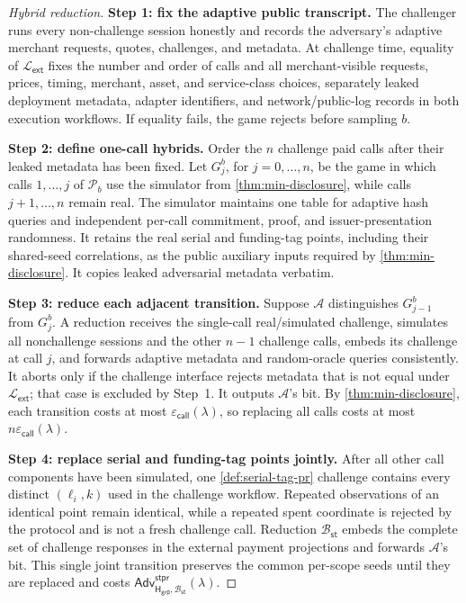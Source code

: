 \documentclass[letterpaper]{article}
\newcommand{\trace}{\mathcal{P}}
\newcommand{\adv}{\mathcal{A}}
\newcommand{\hashG}{\mathsf{H}_{\mathsf{grp}}}
\newcommand{\Adv}{\mathsf{Adv}}
\begin{document}
\begin{proof}[Hybrid reduction]
\textbf{Step 1: fix the adaptive public transcript.}
The challenger runs every non-challenge session honestly and records the
adversary's adaptive merchant requests, quotes, challenges, and metadata. At
challenge time, equality of \(\mathcal L_{\mathsf{ext}}\) fixes the number and
order of calls and all merchant-visible requests, prices, timing, merchant,
asset, and service-class choices, separately leaked deployment metadata,
adapter identifiers, and network/public-log records in both
execution workflows. If equality fails, the game rejects before sampling \(b\).

\textbf{Step 2: define one-call hybrids.}
Order the \(n\) challenge paid calls after their leaked metadata has been
fixed. Let \(G_j^b\), for \(j=0,\ldots,n\), be the game in which calls
\(1,\ldots,j\) of \(\trace_b\) use the simulator from
\cref{thm:min-disclosure}, while calls \(j+1,\ldots,n\) remain real. The
simulator maintains one table for adaptive hash queries and independent
per-call commitment, proof, and issuer-presentation randomness. It retains the
real serial and funding-tag points, including their shared-seed correlations,
as the public auxiliary inputs required by \cref{thm:min-disclosure}. It copies
leaked adversarial metadata verbatim.

\textbf{Step 3: reduce each adjacent transition.}
Suppose \(\adv\) distinguishes \(G_{j-1}^b\) from \(G_j^b\). A reduction
receives the single-call real/simulated challenge, simulates all nonchallenge
sessions and the other \(n-1\) challenge calls, embeds its challenge at call
\(j\), and forwards adaptive metadata and random-oracle queries consistently.
It aborts only if the challenge interface rejects metadata that is not equal
under \(\mathcal L_{\mathsf{ext}}\); that case is excluded by Step~1. It outputs
\(\adv\)'s bit. By \cref{thm:min-disclosure}, each transition costs at most
\(\varepsilon_{\mathsf{call}}(\lambda)\), so replacing all calls costs at most
\(n\varepsilon_{\mathsf{call}}(\lambda)\).

\textbf{Step 4: replace serial and funding-tag points jointly.}
After all other call components have been simulated, one
\cref{def:serial-tag-pr} challenge contains every distinct
\((\ell_i,k)\) used in the challenge workflow. Repeated observations of an
identical point remain identical, while a repeated spent coordinate is rejected
by the protocol and is not a fresh challenge call. Reduction
\(\mathcal B_{\mathsf{st}}\) embeds the complete set of challenge responses in
the external payment projections and forwards \(\adv\)'s bit. This single
joint transition preserves the common per-scope seeds until they are replaced
and costs
\(\Adv^{\mathsf{stpr}}_{\hashG,\mathcal B_{\mathsf{st}}}(\lambda)\).


\end{proof}
\end{document}
